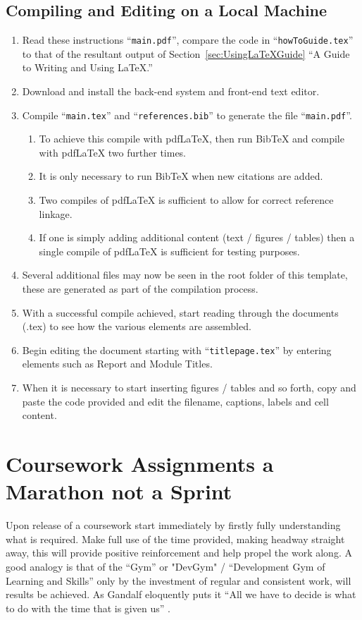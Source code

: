 \subsection{Compiling and Editing on a Local Machine}
{
\begin{enumerate}
\item Read these instructions ``{\tt main.pdf}'', compare the code in ``{\tt howToGuide.tex}'' to that of the resultant output of Section~\ref{sec:UsingLaTeXGuide} ``A Guide to Writing and Using \LaTeX.'' 
\item Download and install the back-end \latex system and front-end text editor. 
\item Compile ``{\tt main.tex}'' and ``{\tt references.bib}'' to generate the file ``{\tt main.pdf}''.
\begin{enumerate}
\item To achieve this compile with pdfLaTeX, then run BibTeX and compile with pdfLaTeX two further times.
\item It is only necessary to run BibTeX when new citations are added.
\item Two compiles of pdfLaTeX is sufficient to allow for correct reference linkage.
\item If one is simply adding additional content (text / figures / tables) then a single compile of pdfLaTeX is sufficient for testing purposes.
\end{enumerate}
\item Several additional files may now be seen in the root folder of this template, these are generated as part of the compilation process.
\item With a successful compile achieved, start reading through the \latex documents (.tex) to see how the various elements are assembled.
\item Begin editing the document starting with ``{\tt titlepage.tex}'' by entering elements such as Report and Module Titles.
\item When it is necessary to start inserting figures / tables and so forth, copy and paste the \latex code provided and edit the filename, captions, labels and cell content.
\end{enumerate}}

\section{Coursework Assignments a Marathon not a Sprint}
Upon release of a coursework start immediately by firstly fully understanding what is required. Make full use of the time provided, making headway straight away, this will provide positive reinforcement and help propel the work along. A good analogy is that of the ``Gym'' or "DevGym" / ``Development Gym of Learning and Skills'' only by the investment of regular and consistent work, will results be achieved. As Gandalf eloquently puts it ``All we have to decide is what to do with the time that is given us'' \cite{book:Tolkien:1991:FOTR}\cite{online:Jackson:2001:FOTR}. 

